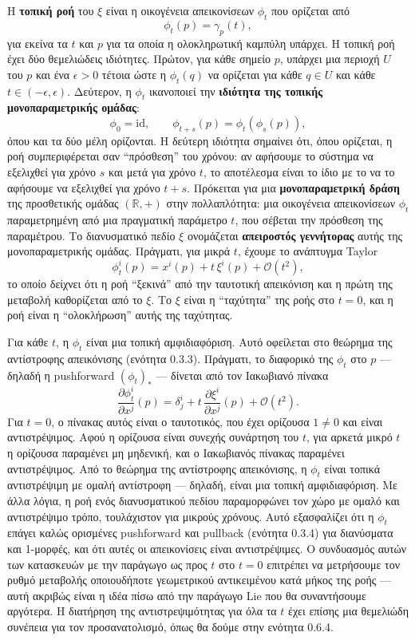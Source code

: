 \documentclass[12pt]{article}
\begin{document}
Η \textbf{τοπική ροή} του $\xi$ είναι η οικογένεια απεικονίσεων $\phi_t$ που ορίζεται από
\[
\phi_t(p) = \gamma_p(t),
\]
για εκείνα τα $t$ και $p$ για τα οποία η ολοκληρωτική καμπύλη υπάρχει. Η τοπική ροή έχει δύο θεμελιώδεις ιδιότητες. Πρώτον, για κάθε σημείο $p$, υπάρχει μια περιοχή $U$ του $p$ και ένα $\epsilon > 0$ τέτοια ώστε η $\phi_t(q)$ να ορίζεται για κάθε $q \in U$ και κάθε $t \in (-\epsilon, \epsilon)$. Δεύτερον, η $\phi_t$ ικανοποιεί την \textbf{ιδιότητα της τοπικής μονοπαραμετρικής ομάδας}:
\[
\phi_0 = \text{id}, \qquad \phi_{t+s}(p) = \phi_t(\phi_s(p)),
\]
όπου και τα δύο μέλη ορίζονται. Η δεύτερη ιδιότητα σημαίνει ότι, όπου ορίζεται, η ροή συμπεριφέρεται σαν ``πρόσθεση'' του χρόνου: αν αφήσουμε το σύστημα να εξελιχθεί για χρόνο $s$ και μετά για χρόνο $t$, το αποτέλεσμα είναι το ίδιο με το να το αφήσουμε να εξελιχθεί για χρόνο $t+s$. Πρόκειται για μια \textbf{μονοπαραμετρική δράση} της προσθετικής ομάδας $(\mathbb{R}, +)$ στην πολλαπλότητα: μια οικογένεια απεικονίσεων $\phi_t$ παραμετρημένη από μια πραγματική παράμετρο $t$, που σέβεται την πρόσθεση της παραμέτρου. Το διανυσματικό πεδίο $\xi$ ονομάζεται \textbf{απειροστός γεννήτορας} αυτής της μονοπαραμετρικής ομάδας. Πράγματι, για μικρά $t$, έχουμε το ανάπτυγμα Taylor
\[
\phi_t^i(p) = x^i(p) + t \, \xi^i(p) + \mathcal{O}(t^2), \tag{0.21}
\]
το οποίο δείχνει ότι η ροή ``ξεκινά'' από την ταυτοτική απεικόνιση και η πρώτη της μεταβολή καθορίζεται από το $\xi$. Το $\xi$ είναι η ``ταχύτητα'' της ροής στο $t=0$, και η ροή είναι η ``ολοκλήρωση'' αυτής της ταχύτητας.

Για κάθε $t$, η $\phi_t$ είναι μια τοπική αμφιδιαφόριση. Αυτό οφείλεται στο θεώρημα της αντίστροφης απεικόνισης (ενότητα 0.3.3). Πράγματι, το διαφορικό της $\phi_t$ στο $p$ --- δηλαδή η pushforward $(\phi_t)_*$ --- δίνεται από τον Ιακωβιανό πίνακα
\[
\frac{\partial \phi_t^i}{\partial x^j}(p) = \delta^i_j + t \, \frac{\partial \xi^i}{\partial x^j}(p) + \mathcal{O}(t^2).
\]
Για $t = 0$, ο πίνακας αυτός είναι ο ταυτοτικός, που έχει ορίζουσα $1 \neq 0$ και είναι αντιστρέψιμος. Αφού η ορίζουσα είναι συνεχής συνάρτηση του $t$, για αρκετά μικρό $t$ η ορίζουσα παραμένει μη μηδενική, και ο Ιακωβιανός πίνακας παραμένει αντιστρέψιμος. Από το θεώρημα της αντίστροφης απεικόνισης, η $\phi_t$ είναι τοπικά αντιστρέψιμη με ομαλή αντίστροφη --- δηλαδή, είναι μια τοπική αμφιδιαφόριση. Με άλλα λόγια, η ροή ενός διανυσματικού πεδίου παραμορφώνει τον χώρο με ομαλό και αντιστρέψιμο τρόπο, τουλάχιστον για μικρούς χρόνους. Αυτό εξασφαλίζει ότι η $\phi_t$ επάγει καλώς ορισμένες pushforward και pullback (ενότητα 0.3.4) για διανύσματα και 1-μορφές, και ότι αυτές οι απεικονίσεις είναι αντιστρέψιμες. Ο συνδυασμός αυτών των κατασκευών με την παράγωγο ως προς $t$ στο $t=0$ επιτρέπει να μετρήσουμε τον ρυθμό μεταβολής οποιουδήποτε γεωμετρικού αντικειμένου κατά μήκος της ροής --- αυτή ακριβώς είναι η ιδέα πίσω από την παράγωγο Lie που θα συναντήσουμε αργότερα. Η διατήρηση της αντιστρεψιμότητας για όλα τα $t$ έχει επίσης μια θεμελιώδη συνέπεια για τον προσανατολισμό, όπως θα δούμε στην ενότητα 0.6.4.
\end{document}
